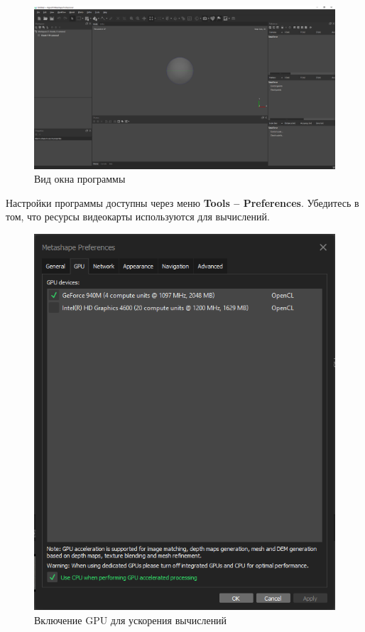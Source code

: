 \documentclass[
  12pt,
]{book}
\begin{document}
\begin{figure}
\centering
\includegraphics{images/Ref18/Interface.png}
\caption{Вид окна программы}
\end{figure}

Настройки программы доступны через меню \textbf{Tools -- Preferences}. Убедитесь в том, что ресурсы видеокарты используются для вычислений.

\begin{figure}
\centering
\includegraphics{images/Ref18/Preferences.png}
\caption{Включение GPU для ускорения вычислений}
\end{figure}
\end{document}
